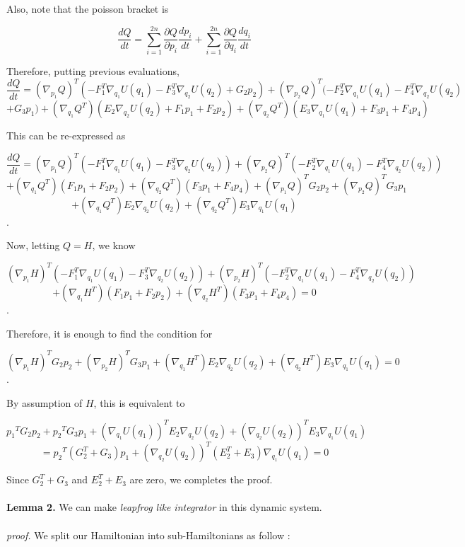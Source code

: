 \documentclass{article}
\begin{document}
\\
\\
Also, note that the poisson bracket is 

$$\displaystyle\frac{dQ}{dt} = \sum_{i=1}^{2n} \frac{\partial Q} {\partial p_i} \frac{dp_i}{dt}+  \sum_{i=1}^{2n} \frac{\partial Q} {\partial q_i} \frac{dq_i}{dt}$$

\noindent Therefore, putting previous evaluations, 
$$\displaystyle\frac{dQ}{dt}
 = (\nabla_{p_1}Q)^T (-F_1^T \nabla_{q_1} U(q_1) - F_3^T \nabla_{q_2} U(q_2)  + G_2 p_2) 
+  (\nabla_{p_2}Q)^T(-F_2^T \nabla_{q_1} U(q_1) - F_4^T \nabla_{q_2} U(q_2) $$ $$ + G_3 p_1) 
+ (\nabla_{q_1}Q^T)(E_2 \nabla_{q_2} U(q_2) + F_1 p_1 + F_2 p_2) + (\nabla_{q_2}Q^T)(E_3 \nabla_{q_1} U(q_1) + F_3 p_1 + F_4 p_4)$$

This can be re-expressed as

$$\displaystyle\frac{dQ}{dt} = {(\nabla_{p_1}Q)^T}(-F_1^T \nabla_{q_1} U(q_1) - F_3^T\nabla_{q_2} U(q_2) ) +  
(\nabla_{p_2}Q)^T(-F_2^T \nabla_{q_1} U(q_1) - F_4^T \nabla_{q_2} U(q_2)) $$
$$+(\nabla_{q_1}Q^T)( F_1 p_1 + F_2 p_2) +
(\nabla_{q_2}Q^T)(F_3 p_1 + F_4 p_4) +
(\nabla_{p_1}Q)^TG_2 p_2+ 
(\nabla_{p_2}Q)^TG_3 p_1$$
$$+(\nabla_{q_1}Q^T)E_2 \nabla_{q_2} U(q_2) +(\nabla_{q_2}Q^T)E_3 \nabla_{q_1} U(q_1)$$.

Now, letting $Q=H$, we know 

$${(\nabla_{p_1}H)^T}(-F_1^T \nabla_{q_1} U(q_1) - F_3^T\nabla_{q_2} U(q_2) ) +  (\nabla_{p_2}H)^T(-F_2^T \nabla_{q_1} U(q_1) - F_4^T \nabla_{q_2} U(q_2)) $$
$$+  
(\nabla_{q_1}H^T)( F_1 p_1 + F_2 p_2) +
(\nabla_{q_2}H^T)(F_3 p_1 + F_4 p_4)=0$$.

Therefore, it is enough to find the condition for 

$$(\nabla_{p_1}H)^TG_2 p_2+ 
(\nabla_{p_2}H)^TG_3 p_1+
(\nabla_{q_1}H^T)E_2 \nabla_{q_2} U(q_2) +
(\nabla_{q_2}H^T)E_3 \nabla_{q_1} U(q_1) = 0$$.

By assumption of $H$, this is equivalent to 

$${p_1}^TG_2 p_2+ 
{p_2}^TG_3 p_1+
(\nabla_{q_1}U(q_1))^TE_2 \nabla_{q_2} U(q_2) +
(\nabla_{q_2}U(q_2))^TE_3 \nabla_{q_1} U(q_1) $$
$$={p_2}^T(G_2^T + G_3) p_1 + (\nabla_{q_2}U(q_2))^T(E_2^T + E_3) \nabla_{q_1} U(q_1) = 0$$

Since $G_2^T + G_3$ and $E_2^T + E_3 $ are zero, we completes the proof. 
\\
\\
\noindent \textbf{Lemma 2.}  We can make \textit{leapfrog like integrator} in this dynamic system.
\\
\\
\textit{proof.} We split our Hamiltonian into sub-Hamiltonians as follow :
\end{document}
